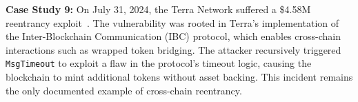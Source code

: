 \textbf{Case Study 9:} \label{case-study:9} On July 31, 2024, the Terra Network suffered a \$4.58M reentrancy exploit~\cite{attack-report:terra}. The vulnerability was rooted in Terra's implementation of the Inter-Blockchain Communication (IBC) protocol, which enables cross-chain interactions such as wrapped token bridging. The attacker recursively triggered \lstinline{MsgTimeout} to exploit a flaw in the protocol's timeout logic, causing the blockchain to mint additional tokens without asset backing. This incident remains the only documented example of cross-chain reentrancy.